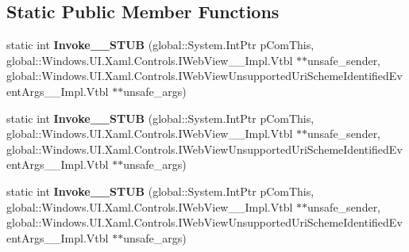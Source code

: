 \subsection*{Static Public Member Functions}
\begin{DoxyCompactItemize}
\item 
\mbox{\label{struct_windows_1_1_foundation_1_1_typed_event_handler___a___windows___u_i___xaml___controls___we2ca8d6ce2726bd3be0205817ae158dc8_a3fcd56dcdbb64b1d34cf075e65d2460f}} 
static int {\bfseries Invoke\+\_\+\+\_\+\+S\+T\+UB} (global\+::\+System.\+Int\+Ptr p\+Com\+This, global\+::\+Windows.\+U\+I.\+Xaml.\+Controls.\+I\+Web\+View\+\_\+\+\_\+\+Impl.\+Vtbl $\ast$$\ast$unsafe\+\_\+sender, global\+::\+Windows.\+U\+I.\+Xaml.\+Controls.\+I\+Web\+View\+Unsupported\+Uri\+Scheme\+Identified\+Event\+Args\+\_\+\+\_\+\+Impl.\+Vtbl $\ast$$\ast$unsafe\+\_\+args)
\item 
\mbox{\label{struct_windows_1_1_foundation_1_1_typed_event_handler___a___windows___u_i___xaml___controls___we2ca8d6ce2726bd3be0205817ae158dc8_a3fcd56dcdbb64b1d34cf075e65d2460f}} 
static int {\bfseries Invoke\+\_\+\+\_\+\+S\+T\+UB} (global\+::\+System.\+Int\+Ptr p\+Com\+This, global\+::\+Windows.\+U\+I.\+Xaml.\+Controls.\+I\+Web\+View\+\_\+\+\_\+\+Impl.\+Vtbl $\ast$$\ast$unsafe\+\_\+sender, global\+::\+Windows.\+U\+I.\+Xaml.\+Controls.\+I\+Web\+View\+Unsupported\+Uri\+Scheme\+Identified\+Event\+Args\+\_\+\+\_\+\+Impl.\+Vtbl $\ast$$\ast$unsafe\+\_\+args)
\item 
\mbox{\label{struct_windows_1_1_foundation_1_1_typed_event_handler___a___windows___u_i___xaml___controls___we2ca8d6ce2726bd3be0205817ae158dc8_a3fcd56dcdbb64b1d34cf075e65d2460f}} 
static int {\bfseries Invoke\+\_\+\+\_\+\+S\+T\+UB} (global\+::\+System.\+Int\+Ptr p\+Com\+This, global\+::\+Windows.\+U\+I.\+Xaml.\+Controls.\+I\+Web\+View\+\_\+\+\_\+\+Impl.\+Vtbl $\ast$$\ast$unsafe\+\_\+sender, global\+::\+Windows.\+U\+I.\+Xaml.\+Controls.\+I\+Web\+View\+Unsupported\+Uri\+Scheme\+Identified\+Event\+Args\+\_\+\+\_\+\+Impl.\+Vtbl $\ast$$\ast$unsafe\+\_\+args)

\end{DoxyCompactItemize}
